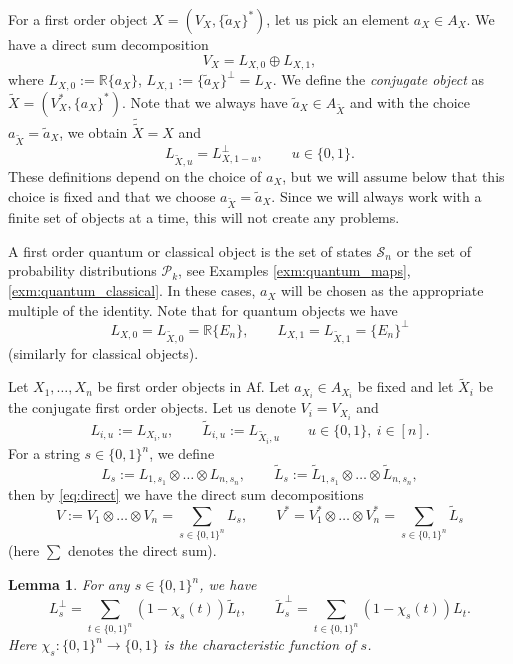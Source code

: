 \documentclass[12pt]{article}
\newtheorem{lemma}{Lemma}
\theoremstyle{definition}
\theoremstyle{remark}
\def\Pe{\mathcal P}
\def\Se {\mathcal S}
\def \Af{\mathrm{Af}}
\begin{document}
For a first order object $X=(V_X, \{\tilde a_X\}^*)$, let us pick an element $a_X\in
A_X$. We have a direct sum decomposition
\begin{equation}\label{eq:direct}
V_X=L_{X,0}\oplus L_{X,1},
\end{equation}
where $L_{X,0}:= \mathbb R\{a_X\}$, $L_{X,1}:=\{\tilde a_X\}^\perp=L_X$.
We define the {\em conjugate object}  as $\tilde X=(V_X^*,\{a_X\}^*)$. Note that we always
have $\tilde a_X\in A_{\tilde X}$ and with the choice $a_{\tilde X}=\tilde a_X$, we obtain 
$\tilde{\tilde X}=X$ and 
\begin{equation}\label{eq:complement}
L_{\tilde X,u}=L_{X,1-u}^\perp,\qquad u\in \{0,1\}.
\end{equation}
These  definitions depend on the choice of $a_X$, but we will assume below that this
choice is fixed and that we choose $a_{\tilde X}=\tilde a_X$. Since we will always work
with a finite set of objects at a time, this will not create any problems. 

 A  first order quantum
or classical object  is the set of states $\Se_n$ or the set of probability distributions
$\Pe_k$, see Examples \ref{exm:quantum_maps}, \ref{exm:quantum_classical}.
In these cases, $a_X$ will be chosen as the appropriate multiple of the identity.
 Note that for quantum objects we have
 \[
L_{X,0}=L_{\tilde X,0}= \mathbb R\{E_n\},\qquad  L_{X,1}=L_{\tilde X,1}= \{E_n\}^\perp
 \]
(similarly for classical objects). 


Let $X_1,\dots,X_n$ be first order objects in $\Af$. Let $a_{X_i}\in A_{X_i}$ be fixed and
let $\tilde X_i$ be the conjugate first order objects. Let us denote $V_i=V_{X_i}$ and 
\[
L_{i,u}:= L_{X_i,u},\qquad  \tilde L_{i,u}:= L_{\tilde X_i,u} \qquad u\in \{0,1\},\ i\in [n].
\]
For a string $s\in \{0,1\}^n$, we define
\[
L_s:=L_{1,s_1}\otimes\dots \otimes L_{n,s_n}, \qquad \tilde L_s:=\tilde
L_{1,s_1}\otimes\dots \otimes \tilde L_{n,s_n},
\]
then by \eqref{eq:direct} we have the direct sum decompositions 
\[
V:=V_1\otimes \dots \otimes V_n=\sum_{s\in \{0,1\}^n} L_s,\qquad V^*=V_1^*\otimes
\dots\otimes V_n^*=\sum_{s\in \{0,1\}^n} \tilde L_s
\]
(here $\sum$ denotes the direct sum).


\begin{lemma}\label{lemma:Lperp}   For any $s\in \{0,1\}^n$, we have 
\[
L_s^\perp=
\sum_{t\in\{0,1\}^n} (1-{\chi}_s(t))\tilde L_t,\qquad \tilde L_s^\perp=
\sum_{t\in\{0,1\}^n} (1-{\chi}_s(t))L_t.
\]
Here $\chi_s:\{0,1\}^n\to\{0,1\}$ is the characteristic function of $s$. 

\end{lemma}
\end{document}
